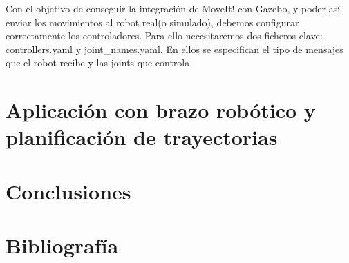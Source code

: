 \documentclass[12pt,spanish,chapterprefix, numbers=noenddot]{book}
\numberwithin{equation}{section}
\numberwithin{figure}{section}
\begin{document}
Con el objetivo de conseguir la integración de MoveIt! con Gazebo, y poder así enviar los movimientos al robot real(o simulado), debemos configurar correctamente los controladores. Para ello necesitaremos dos ficheros clave: controllers.yaml y joint\_names.yaml.  En ellos se especifican el tipo de mensajes que el robot recibe y las joints que controla.  

\chapter{Aplicación con brazo robótico y planificación de trayectorias}

\chapter{Conclusiones}

\chapter*{Bibliografía}
\end{document}

